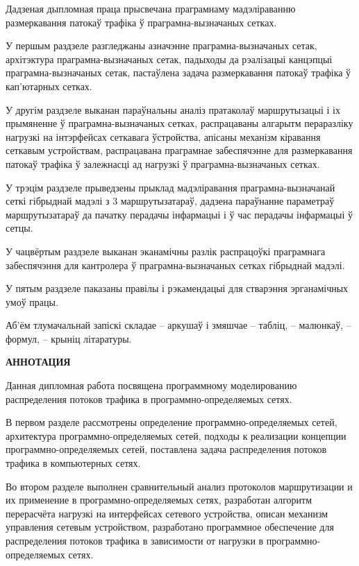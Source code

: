 \thispagestyle{empty}

Дадзеная дыпломная праца прысвечана праграмнаму мадэліраванню
размеркавання патокаў трафіка ў праграмна-вызначаных сетках.

У першым раздзеле разгледжаны азначэнне праграмна-вызначаных сетак,
архітэктура праграмна-вызначаных сетак, падыходы да рэалізацыі
канцэпцыі праграмна-вызначаных сетак, пастаўлена задача
размеркавання патокаў трафіка ў кап'ютарных сетках.

У другім раздзеле выканан параўнальны аналіз пратаколаў маршрутызацыі
і іх прымяненне ў праграмна-вызначаных сетках, распрацаваны алгарытм
пераразліку нагрузкі на інтэрфейсах сеткавага ўстройства,
апісаны механізм кіравання сеткавым устройствам, распрацавана
праграмнае забеспячэнне для размеркавання патокаў трафіка ў
залежнасці ад нагрузкі ў праграмна-вызначаных сетках.

У трэцім раздзеле прыведзены прыклад мадэліравання праграмна-вызначанай
сеткі гібрыднай мадэлі з 3 маршрутызатараў, дадзена параўнанне параметраў
маршрутызатараў да пачатку перадачы інфармацыі і ў час перадачы інфармацыі
ў сетцы.

У чацвёртым раздзеле выканан эканамічны разлік распрацоўкі праграмнага
забеспячэння для кантролера ў праграмна-вызначаных сетках гібрыднай мадэлі.

У пятым раздзеле паказаны правілы і рэкамендацыі для стварэння
эрганамічных умоў працы.

Аб'ём тлумачальнай запіскі складае -- аркушаў і змяшчае
-- табліц, -- малюнкаў, -- формул, -- крыніц літаратуры.

\clearpage

\begin{center}
\fontsize{14}{14}
\selectfont
\textbf{АННОТАЦИЯ}
\end{center}
\thispagestyle{empty}

Данная дипломная работа посвящена программному моделированию
распределения потоков трафика в программно-определяемых сетях.

В первом разделе рассмотрены определение программно-определяемых
сетей, архитектура программно-определяемых сетей, подходы к реализации
концепции программно-оп\-ре\-де\-ля\-емых сетей, поставлена задача распределения
потоков трафика в компьютерных сетях.

Во втором разделе выполнен сравнительный анализ протоколов маршрутизации
и их применение в программно-определяемых сетях, разработан алгоритм
перерасчёта нагрузкі на интерфейсах сетевого устройства, описан механизм
управления сетевым устройством, разработано программное обеспечение для
распределения потоков трафика в зависимости от нагрузки в программно-определяемых сетях.

